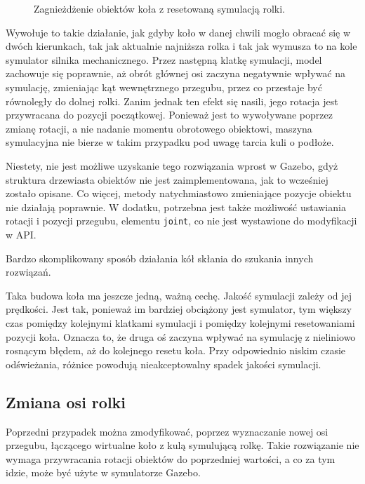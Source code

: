 		\begin{figure}[H]
		\caption{Zagnieżdżenie obiektów koła z resetowaną symulacją rolki.}
		\label{fig:vrep_wheel}
		\end{figure}

		Wywołuje to takie działanie, jak gdyby koło w danej chwili mogło obracać się w dwóch kierunkach, tak jak aktualnie najniższa rolka i tak jak wymusza to na kole 
		symulator silnika mechanicznego.
		Przez następną klatkę symulacji, model zachowuje się poprawnie, aż obrót głównej osi zaczyna negatywnie wpływać na symulację,
		zmieniając kąt wewnętrznego przegubu, przez co przestaje być równoległy do dolnej rolki.
		Zanim jednak ten efekt się nasili, jego rotacja jest przywracana do pozycji początkowej.
		Ponieważ jest to wywoływane poprzez zmianę rotacji, a nie nadanie momentu obrotowego obiektowi, 
		maszyna symulacyjna nie bierze w takim przypadku pod uwagę tarcia kuli o podłoże. 

		Niestety, nie jest możliwe uzyskanie tego rozwiązania wprost w Gazebo, gdyż struktura drzewiasta obiektów nie jest zaimplementowana, jak to wcześniej zostało opisane.
		Co więcej, metody natychmiastowo zmieniające pozycje obiektu nie działają poprawnie.
		W dodatku, potrzebna jest także możliwość ustawiania rotacji i pozycji przegubu, elementu \texttt{joint}, co nie jest wystawione do modyfikacji w API.

		Bardzo skomplikowany sposób działania kół skłania do szukania innych rozwiązań.

		Taka budowa koła ma jeszcze jedną, ważną cechę. 
		Jakość symulacji zależy od jej prędkości.
		Jest tak, ponieważ im bardziej obciążony jest symulator, tym większy czas pomiędzy kolejnymi klatkami symulacji i pomiędzy kolejnymi resetowaniami pozycji koła.
		Oznacza to, że druga oś zaczyna wpływać na symulację z nieliniowo rosnącym błędem, aż do kolejnego resetu koła.
		Przy odpowiednio niskim czasie odświeżania, różnice powodują nieakceptowalny spadek jakości symulacji.

	\subsection{Zmiana osi rolki}
		Poprzedni przypadek można zmodyfikować, poprzez wyznaczanie nowej osi przegubu, łączącego wirtualne koło z kulą symulującą rolkę.
		Takie rozwiązanie nie wymaga przywracania rotacji obiektów do poprzedniej wartości, a co za tym idzie, może być użyte w symulatorze Gazebo.

